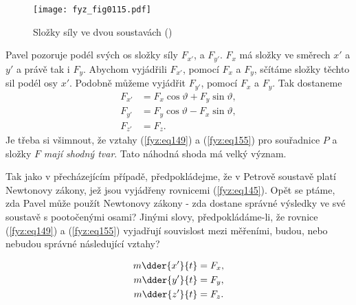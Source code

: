     \begin{figure}[ht!]  %
      \centering
      \texttt{[image: fyz\_fig0115.pdf]}
      \caption{Složky síly ve dvou soustavách
              (\cite[s.~157]{Feynman01})}
      \label{fyz:fig0115}
    \end{figure}

    Pavel pozoruje podél svých os složky síly \(F_{x'}\), a \(F_{y'}\). \(F_{x}\) má složky ve 
    směrech \(x'\) a \(y'\) a právě tak i \(F_y\). Abychom vyjádřili \(F_{x'}\), pomocí \(F_x\) a 
    \(F_y\), sčítáme složky těchto sil podél osy \(x'\). Podobně můžeme vyjádřit \(F_{y'}\), pomocí 
    \(F_x\) a \(F_y\). Tak dostaneme
    \begin{subequations}\label{fyz:eq155}
      \begin{align}
        F_{x'} &= F_x\cos\vartheta + F_y\sin\vartheta, \label{fyz:eq155a}\\
        F_{y'} &= F_y\cos\vartheta - F_x\sin\vartheta, \label{fyz:eq155b}\\
        F_{z'} &= F_z.                                 \label{fyz:eq155c}
      \end{align}
    \end{subequations}
    Je třeba si všimnout, že vztahy (\ref{fyz:eq149}) a (\ref{fyz:eq155}) pro souřadnice \(P\) a 
    složky \(F\) \emph{mají shodný tvar}. Tato náhodná shoda má velký význam.
    
    Tak jako v přecházejícím případě, předpokládejme, že v Petrově soustavě platí Newtonovy zákony, 
    jež jsou vyjádřeny rovnicemi (\ref{fyz:eq145}). Opět se ptáme, zda Pavel může použít Newtonovy 
    zákony - zda dostane správné výsledky ve své soustavě s pootočenými osami? Jinými slovy, 
    předpokládáme-li, že rovnice (\ref{fyz:eq149}) a (\ref{fyz:eq155}) vyjadřují souvislost mezi 
    měřeními, budou, nebo nebudou správné následující vztahy?
    
    \begin{subequations}\label{fyz:eq156}
      \begin{align}
        m\dder{x'}{t} &= F_{x}, \label{fyz:eq156a}  \\
        m\dder{y'}{t} &= F_{y}, \label{fyz:eq156b}  \\
        m\dder{z'}{t} &= F_{z}. \label{fyz:eq156c}
      \end{align}
    \end{subequations}
    
